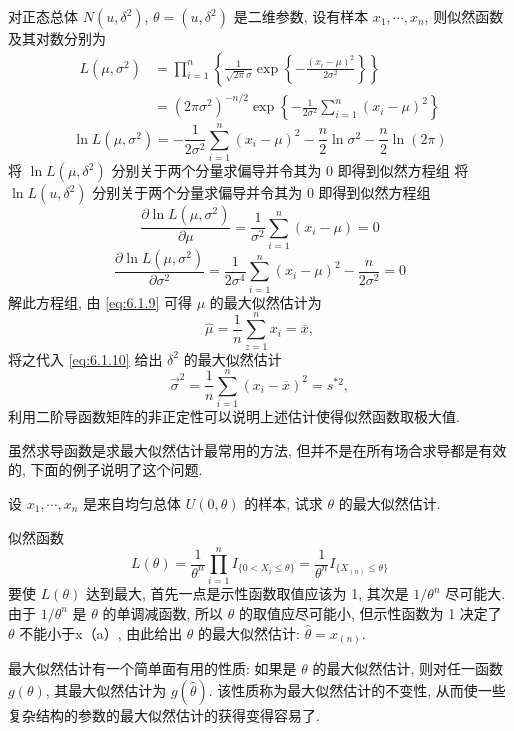 \begin{example}\label{exam:6.1.7}
对正态总体 $N(u,\delta^2)$, $\theta=(u,\delta^2)$ 是二维参数, 设有样本 $x_1,\cdots,x_n$, 则似然函数及其对数分别为
\begin{align*}
L\left(\mu,\sigma^{2}\right) 
&=\prod_{i=1}^{n}\left\{\frac{1}{\sqrt{2\pi}\sigma}\exp \left\{-\frac{\left(x_{i}-\mu\right)^{2}}{2 \sigma^{2}}\right\}\right\}\\ 
&=\left(2\pi\sigma^{2}\right)^{-n/2}\exp\left\{-\frac{1}{2 \sigma^{2}}\sum_{i=1}^{n}\left(x_{i}-\mu\right)^{2}\right\}
\end{align*}
\[\ln L\left(\mu,\sigma^{2}\right)=-\frac{1}{2\sigma^{2}} \sum_{i=1}^{n}\left(x_{i}-\mu\right)^{2}-\frac{n}{2} \ln \sigma^{2}-\frac{n}{2}\ln(2\pi)\]
将 $\ln L(\mu,\delta^2)$ 分别关于两个分量求偏导并令其为 0 即得到似然方程组
将 $\ln L(u,\delta^2)$ 分别关于两个分量求偏导并令其为 0 即得到似然方程组
\begin{equation}\label{eq:6.1.9}
\frac{\partial\ln L\left(\mu, \sigma^{2}\right)}{\partial \mu}=\frac{1}{\sigma^{2}} \sum_{i=1}^{n}\left(x_{i}-\mu\right)=0
\end{equation}
\begin{equation}\label{eq:6.1.10}
\frac{\partial \ln L\left(\mu, \sigma^{2}\right)}{\partial \sigma^{2}}=\frac{1}{2 \sigma^{4}} \sum_{i=1}^{n}\left(x_{i}-\mu\right)^{2}-\frac{n}{2\sigma^{2}}=0
\end{equation}
解此方程组, 由 \eqref{eq:6.1.9} 可得 $\mu$ 的最大似然估计为
\[\hat{\mu}=\frac{1}{n} \sum_{z=1}^{n} x_{i}=\overline{x},\]
将之代入 \eqref{eq:6.1.10} 给出 $\delta^2$ 的最大似然估计
\[\vec{\sigma}^{2}=\frac{1}{n} \sum_{i=1}^{n}\left(x_{i}-\overline{x}\right)^{2}=s^{* 2},\]
利用二阶导函数矩阵的非正定性可以说明上述估计使得似然函数取极大值.

虽然求导函数是求最大似然估计最常用的方法, 但并不是在所有场合求导都是有效的, 下面的例子说明了这个问题.
\end{example}

\begin{example}%
设 $x_1,\cdots,x_n$ 是来自均匀总体 $U(0,\theta)$ 的样本, 试求 $\theta$ 的最大似然估计.
\end{example}
\begin{solution}
似然函数
\[L(\theta)=\frac{1}{\theta^n}\prod_{i=1}^nI_{\{0<X_i\leqslant\theta\}}=\frac{1}{\theta^n}I_{\{X_{(n)}\leqslant\theta\}} \]
要使 $L(\theta)$ 达到最大, 首先一点是示性函数取值应该为 1, 其次是 $1/\theta^n$ 尽可能大. 由于 $1/\theta^n$ 是 $\theta$ 的单调减函数, 所以 $\theta$ 的取值应尽可能小, 但示性函数为 1 决定了 $\theta$ 不能小于x（a）, 由此给出 $\theta$ 的最大似然估计: $\hat{\theta}=x_{(n)}$.

最大似然估计有一个简单面有用的性质: 如果是 $\theta$ 的最大似然估计, 则对任一函数 $g(\theta)$, 其最大似然估计为 $g(\hat{\theta})$. 该性质称为最大似然估计的不变性, 从而使一些复杂结构的参数的最大似然估计的获得变得容易了.
\end{solution}

